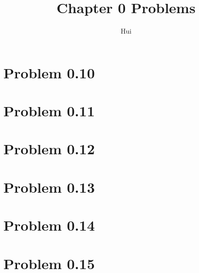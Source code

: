 \documentclass{article}
\begin{document}
\title{Chapter 0 Problems}
\author{Hui}
\date{}
\maketitle

\section{Problem 0.10}

\section{Problem 0.11}

\section{Problem 0.12}

\section{Problem 0.13}

\section{Problem 0.14}

\section{Problem 0.15}
\end{document}
